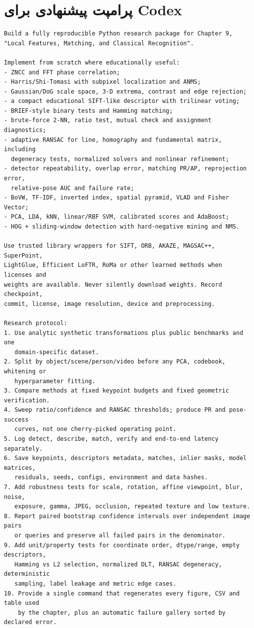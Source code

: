 \documentclass[12pt,openany,oneside]{book}
\begin{document}
\section{پرامپت پیشنهادی برای Codex}
\begin{latin}
\begin{lstlisting}[language={}]
Build a fully reproducible Python research package for Chapter 9,
"Local Features, Matching, and Classical Recognition".

Implement from scratch where educationally useful:
- ZNCC and FFT phase correlation;
- Harris/Shi-Tomasi with subpixel localization and ANMS;
- Gaussian/DoG scale space, 3-D extrema, contrast and edge rejection;
- a compact educational SIFT-like descriptor with trilinear voting;
- BRIEF-style binary tests and Hamming matching;
- brute-force 2-NN, ratio test, mutual check and assignment diagnostics;
- adaptive RANSAC for line, homography and fundamental matrix, including
  degeneracy tests, normalized solvers and nonlinear refinement;
- detector repeatability, overlap error, matching PR/AP, reprojection error,
  relative-pose AUC and failure rate;
- BoVW, TF-IDF, inverted index, spatial pyramid, VLAD and Fisher Vector;
- PCA, LDA, kNN, linear/RBF SVM, calibrated scores and AdaBoost;
- HOG + sliding-window detection with hard-negative mining and NMS.

Use trusted library wrappers for SIFT, ORB, AKAZE, MAGSAC++, SuperPoint,
LightGlue, Efficient LoFTR, RoMa or other learned methods when licenses and
weights are available. Never silently download weights. Record checkpoint,
commit, license, image resolution, device and preprocessing.

Research protocol:
1. Use analytic synthetic transformations plus public benchmarks and one
   domain-specific dataset.
2. Split by object/scene/person/video before any PCA, codebook, whitening or
   hyperparameter fitting.
3. Compare methods at fixed keypoint budgets and fixed geometric verification.
4. Sweep ratio/confidence and RANSAC thresholds; produce PR and pose-success
   curves, not one cherry-picked operating point.
5. Log detect, describe, match, verify and end-to-end latency separately.
6. Save keypoints, descriptors metadata, matches, inlier masks, model matrices,
   residuals, seeds, configs, environment and data hashes.
7. Add robustness tests for scale, rotation, affine viewpoint, blur, noise,
   exposure, gamma, JPEG, occlusion, repeated texture and low texture.
8. Report paired bootstrap confidence intervals over independent image pairs
   or queries and preserve all failed pairs in the denominator.
9. Add unit/property tests for coordinate order, dtype/range, empty descriptors,
   Hamming vs L2 selection, normalized DLT, RANSAC degeneracy, deterministic
   sampling, label leakage and metric edge cases.
10. Provide a single command that regenerates every figure, CSV and table used
    by the chapter, plus an automatic failure gallery sorted by declared error.
\end{lstlisting}
\end{latin}
\end{document}

